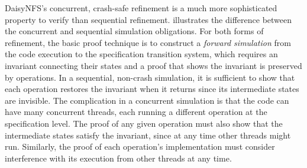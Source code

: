 DaisyNFS's concurrent, crash-safe refinement is a much more sophisticated property to verify
than sequential refinement.  illustrates the difference between the
concurrent and sequential simulation obligations.  For both forms of refinement, the basic proof technique is to construct a
\emph{forward simulation} from the code execution to the specification
transition system, which requires an invariant connecting their states and a
proof that shows the invariant is preserved by operations. In a sequential, non-crash
simulation, it is sufficient to show that each operation restores the invariant
when it returns since its intermediate states are invisible.
The complication in a
concurrent simulation is that the code can have many concurrent threads, each
running a different operation at the specification level. The
proof of any given operation must also show that the intermediate states satisfy the invariant, since at any
time other threads might run. Similarly, the proof of each operation's implementation must
consider interference with its execution from other threads at any time.


